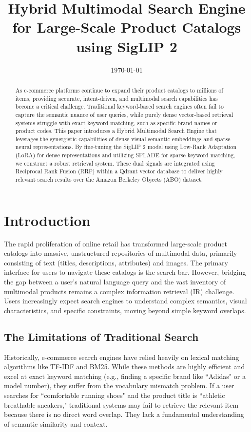 \documentclass[12pt, a4paper]{article}
\title{\textbf{Hybrid Multimodal Search Engine for Large-Scale Product Catalogs using SigLIP 2}}
\author{} %
\date{\today}
\begin{document}
\maketitle

\begin{abstract}
As e-commerce platforms continue to expand their product catalogs to millions of items, providing accurate, intent-driven, and multimodal search capabilities has become a critical challenge. Traditional keyword-based search engines often fail to capture the semantic nuance of user queries, while purely dense vector-based retrieval systems struggle with exact keyword matching, such as specific brand names or product codes. This paper introduces a Hybrid Multimodal Search Engine that leverages the synergistic capabilities of dense visual-semantic embeddings and sparse neural representations. By fine-tuning the SigLIP 2 model using Low-Rank Adaptation (LoRA) for dense representations and utilizing SPLADE for sparse keyword matching, we construct a robust retrieval system. These dual signals are integrated using Reciprocal Rank Fusion (RRF) within a Qdrant vector database to deliver highly relevant search results over the Amazon Berkeley Objects (ABO) dataset.
\end{abstract}


\section{Introduction}

The rapid proliferation of online retail has transformed large-scale product catalogs into massive, unstructured repositories of multimodal data, primarily consisting of text (titles, descriptions, attributes) and images. The primary interface for users to navigate these catalogs is the search bar. However, bridging the gap between a user's natural language query and the vast inventory of multimodal products remains a complex information retrieval (IR) challenge. Users increasingly expect search engines to understand complex semantics, visual characteristics, and specific constraints, moving beyond simple keyword overlaps.

\subsection{The Limitations of Traditional Search}
Historically, e-commerce search engines have relied heavily on lexical matching algorithms like TF-IDF and BM25. While these methods are highly efficient and excel at exact keyword matching (e.g., finding a specific brand like ``Adidas" or a model number), they suffer from the vocabulary mismatch problem. If a user searches for ``comfortable running shoes" and the product title is ``athletic breathable sneakers," traditional systems may fail to retrieve the relevant item because there is no direct word overlap. They lack a fundamental understanding of semantic similarity and context.
\end{document}

